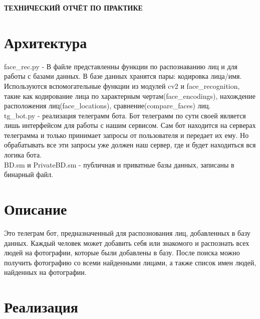 \begin{center}
\bfseries{\large ТЕХНИЧЕСКИЙ ОТЧЁТ ПО ПРАКТИКЕ}
\end{center}

\section*{Архитектура}
face\_rec.py - В файле представленны функции по распознаванию лиц и для работы с базами данных. В базе данных хранятся пары: кодировка лица/имя. Используются вспомогательные функции из модулей cv2 и face\_recognition, такие как кодирование лица по характерным чертам(face\_encodings), нахождение расположения лиц(face\_locations), сравнение(compare\_faces) лиц.\\
tg\_bot.py - реализация телеграмм бота. Бот телеграмм по сути своей является лишь интерфейсом для работы с нашим сервисом. Сам бот находится на серверах телеграмма и только принимает запросы от пользователя и передает их ему. Но обрабатывать все эти запросы уже должен наш сервер, где и будет находиться вся логика бота. \\
BD.sm и PrivateBD.sm - публичная и приватные базы данных, записаны в бинарный файл.

\section*{Описание}
Это телеграм бот, предназначенный для распознования лиц, добавленных в базу данных. Каждый человек может добавить себя или знакомого и распознать всех людей на фотографии, которые были добавлены в базу. После поиска можно получить фотографию со всеми найденными лицами, а также список имен людей, найденных на фотографии. 

\section*{Реализация}

